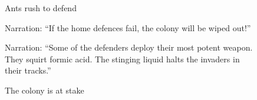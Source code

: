 \documentclass[
  letterpaper,
  DIV=11,
  numbers=noendperiod]{scrartcl}
\begin{document}
\begin{figure}
\begin{minipage}[t]{0.50\linewidth}
{{}

\caption{\label{fig-weaver-ants-3}Ants rush to defend}

}

\end{minipage}%
\newline
\begin{minipage}[t]{0.50\linewidth}

{\centering 

Narration: ``If the home defences fail, the colony will be wiped out!''

}

\end{minipage}%
%
\begin{minipage}[t]{0.50\linewidth}

{\centering 


\caption{\label{fig-weaver-ants-4}The colony is at stake}

}

\end{minipage}%
\newline
\begin{minipage}[t]{0.50\linewidth}

{\centering 

Narration: ``Some of the defenders deploy their most potent weapon. They
squirt formic acid. The stinging liquid halts the invaders in their
tracks.''

}

\end{minipage}%
%
\begin{minipage}[t]{0.50\linewidth}


\end{minipage}
\end{figure}
\end{document}
